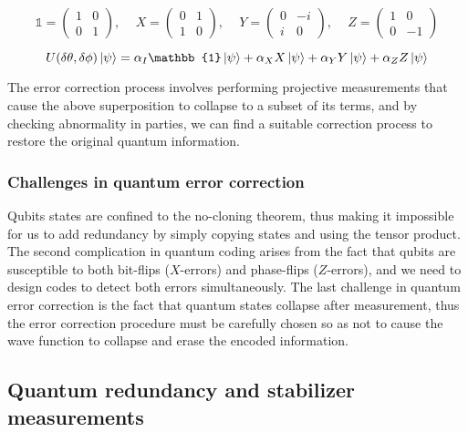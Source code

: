 \documentclass[final,5p,times,twocolumn,authoryear]{elsarticle}
\begin{document}
\[
    \mathbb{1} =
    \begin{pmatrix}
        1 & 0 \\
        0 & 1
    \end{pmatrix}
    \text{, }
    \quad
    X =
    \begin{pmatrix}
        0 & 1 \\
        1 & 0
    \end{pmatrix}
    \text{, }
    \quad
    Y =
    \begin{pmatrix}
        0 & -i \\
        i & 0
    \end{pmatrix}
    \text{, }
    \quad
    Z =
    \begin{pmatrix}
        1 & 0  \\
        0 & -1
    \end{pmatrix}
\]

\[
    U(\delta \theta, \delta \phi) \ket{\psi} = \alpha_{I} \mathbb{1} \ket{\psi} + \alpha_{X} X \ket{\psi} + \alpha_{Y} Y \ket{\psi} + \alpha_{Z} Z \ket{\psi}
\]

The error correction process involves performing projective measurements that cause the above superposition to collapse to a subset of its terms, and by checking abnormality in parties, we can find a suitable correction process to restore the original quantum information.

\subsubsection{Challenges in quantum error correction}

Qubits states are confined to the no-cloning theorem, thus making it impossible for us to add redundancy by simply copying states and using the tensor product. The second complication in quantum coding arises from the fact that qubits are susceptible to both bit-flips ($X$-errors) and phase-flips ($Z$-errors),  and we need to design codes to detect both errors simultaneously. The last challenge in quantum error correction is the fact that quantum states collapse after measurement, thus the error correction procedure must be carefully chosen so as not to cause the wave function to collapse and erase the encoded information.

\subsection{Quantum redundancy and stabilizer measurements}
\end{document}
